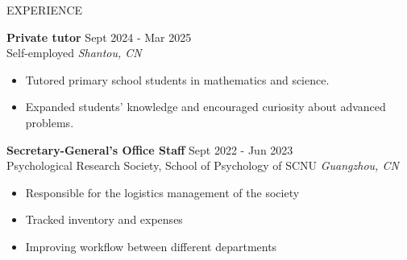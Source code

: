 \documentclass{resume} %
\begin{document}
\begin{rSection}{EXPERIENCE}

\textbf{Private tutor} \hfill Sept 2024 - Mar 2025\\
Self-employed \hfill \textit{Shantou, CN}
 \begin{itemize}
    \itemsep -3pt {} 
     \item Tutored primary school students in mathematics and science.
     \item Expanded students’ knowledge and encouraged curiosity about advanced problems.
 \end{itemize}
 \textbf{Secretary-General’s Office Staff} \hfill Sept 2022 - Jun 2023\\
Psychological Research Society, School of Psychology of SCNU \hfill \textit{Guangzhou, CN}
 \begin{itemize}
    \itemsep -3pt {} 
     \item Responsible for the logistics management of the society
    \item Tracked inventory and expenses
    \item Improving workflow between different departments
 \end{itemize}
\end{rSection} 
\end{document}
